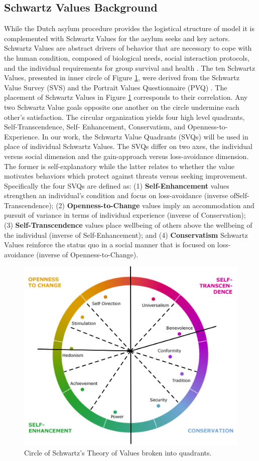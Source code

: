 \documentclass{scspaperproc}
\theoremstyle{scsthe}
\begin{document}
\subsection{Schwartz Values Background}
\label{sec:value-background}
While the Dutch asylum procedure provides the logistical structure of model it is complemented with Schwartz Values for the asylum seeks and key actors. Schwartz Values are abstract drivers of behavior that are necessary to cope with the human condition, composed of biological needs, social interaction protocols, and the individual requirements for group survival and health \cite{77}. The ten Schwartz Values, presented in inner circle of Figure \ref{fig:val-circle}, were derived from the Schwartz Value Survey (SVS) and the Portrait Values Questionnaire (PVQ)  \cite{76}. The placement of Schwartz Values in Figure \ref{fig:val-circle} corresponds to their correlation. Any two Schwartz Value goals opposite one another on the circle undermine each other's satisfaction. The circular organization yields four high level quadrants, Self-Transcendence, Self- Enhancement, Conservatism, and Openness-to-Experience. In our work, the Schwartz Value Quadrants (SVQs) will be used in place of individual Schwartz Values.  The SVQs differ on two axes, the individual versus social dimension and the gain-approach versus loss-avoidance dimension. The former is self-explanatory while the latter relates to whether the value motivates behaviors which protect against threats versus seeking improvement. Specifically the four SVQs are defined as: (1) {\bf Self-Enhancement} values strengthen an individual's condition and focus on loss-avoidance (inverse ofSelf-Transcendence); (2)  {\bf Openness-to-Change} values imply an accommodation and pursuit of variance in terms of individual experience (inverse of Conservation); (3) {\bf Self-Transcendence} values place wellbeing of others above the wellbeing of the individual (inverse of Self-Enhancement); and (4) {\bf Conservatism} Schwartz Values reinforce the status quo in a social manner that is focused on loss-avoidance (inverse of Openness-to-Change).

\begin{figure}[htb]
{
\centering
\includegraphics[width=0.67\columnwidth]{Color-Value-Circle.png}
\caption{Circle of Schwartz's Theory of Values broken into quadrants.}
\label{fig:val-circle}
}
\end{figure}
\end{document}
